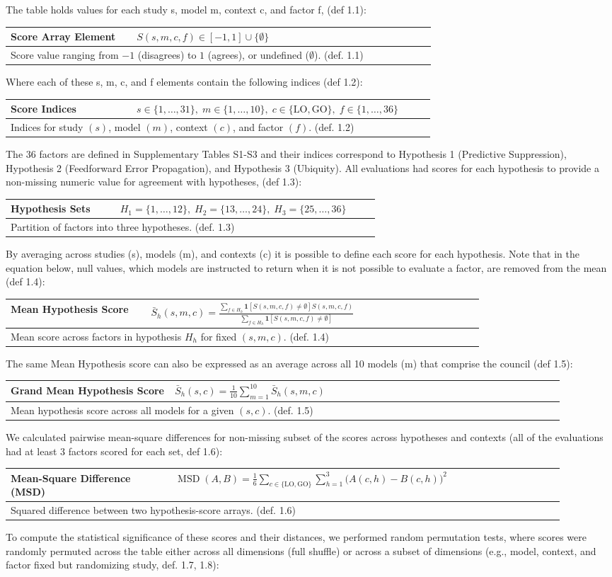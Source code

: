 \documentclass[12pt]{article}
\renewcommand{\arraystretch}{1.06}
\newcommand{\EquationBox}[3]{%
  \begin{center}
  \begingroup
  \small
  \setlength{\tabcolsep}{6pt}%
  \renewcommand{\arraystretch}{1.18}%
  \begin{tabular}{|p{0.27\linewidth}|p{0.64\linewidth}|}
  \hline
  \textbf{#1} & #2 \\
  \hline
  \multicolumn{2}{|p{0.94\linewidth}|}{#3} \\
  \hline
  \end{tabular}
  \endgroup
  \end{center}
}
\begin{document}
The table holds values for each study s, model m, context c, and factor f, (def 1.1):
\EquationBox{Score Array Element}{\(S(s,m,c,f) \in [-1,1]\cup\{\emptyset\}\)}{Score value ranging from \(-1\) (disagrees) to \(1\) (agrees), or undefined (\(\emptyset\)). (def. 1.1)}
Where each of these s, m, c, and f elements contain the following indices (def 1.2):
\EquationBox{Score Indices}{\(s\in\{1,\ldots,31\},\; m\in\{1,\ldots,10\},\; c\in\{\mathrm{LO},\mathrm{GO}\},\; f\in\{1,\ldots,36\}\)}{Indices for study \((s)\), model \((m)\), context \((c)\), and factor \((f)\). (def. 1.2)}
The 36 factors are defined in Supplementary Tables S1-S3 and their indices correspond to Hypothesis 1 (Predictive Suppression), Hypothesis 2 (Feedforward Error Propagation), and Hypothesis 3 (Ubiquity). All evaluations had scores for each hypothesis to provide a non-missing numeric value for agreement with hypotheses, (def 1.3):
\EquationBox{Hypothesis Sets}{\(H_1=\{1,\ldots,12\},\; H_2=\{13,\ldots,24\},\; H_3=\{25,\ldots,36\}\)}{Partition of factors into three hypotheses. (def. 1.3)}
By averaging across studies (s), models (m), and contexts (c) it is possible to define each score for each hypothesis. Note that in the equation below, null values, which models are instructed to return when it is not possible to evaluate a factor, are removed from the mean (def 1.4):
\EquationBox{Mean Hypothesis Score}{\(\displaystyle \bar{S}_h(s,m,c)=\frac{\sum_{f\in H_h}\mathbf{1}[S(s,m,c,f)\ne\emptyset]S(s,m,c,f)}{\sum_{f\in H_h}\mathbf{1}[S(s,m,c,f)\ne\emptyset]}\)}{Mean score across factors in hypothesis \(H_h\) for fixed \((s,m,c)\). (def. 1.4)}
The same Mean Hypothesis score can also be expressed as an average across all 10 models (m) that comprise the council (def 1.5):
\EquationBox{Grand Mean Hypothesis Score}{\(\displaystyle \bar{S}_h(s,c)=\frac{1}{10}\sum_{m=1}^{10}\bar{S}_h(s,m,c)\)}{Mean hypothesis score across all models for a given \((s,c)\). (def. 1.5)}
We calculated pairwise mean-square differences for non-missing subset of the scores across hypotheses and contexts (all of the evaluations had at least 3 factors scored for each set, def 1.6):
\EquationBox{Mean-Square Difference (MSD)}{\(\displaystyle \operatorname{MSD}(A,B)=\frac{1}{6}\sum_{c\in\{\mathrm{LO},\mathrm{GO}\}}\sum_{h=1}^{3}\bigl(A(c,h)-B(c,h)\bigr)^2\)}{Squared difference between two hypothesis-score arrays. (def. 1.6)}
To compute the statistical significance of these scores and their distances, we performed random permutation tests, where scores were randomly permuted across the table either across all dimensions (full shuffle) or across a subset of dimensions (e.g., model, context, and factor fixed but randomizing study, def. 1.7, 1.8):
\end{document}

